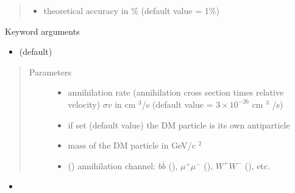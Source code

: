 \documentclass[letterpaper,10pt,english]{sphinxmanual}
\begin{document}
\begin{fulllineitems}
\begin{quote}
\begin{description}
\begin{itemize}
\item {} 
\sphinxAtStartPar
{} \textendash{} theoretical accuracy in \% (default value = 1\%)

\end{itemize}

\end{description}\end{quote}

\sphinxAtStartPar
Keyword arguments
\begin{itemize}
\item {} 
\sphinxAtStartPar
{}    (default)

\end{itemize}
\begin{quote}\begin{description}
\item[{Parameters}] \leavevmode\begin{itemize}
\item {} 
\sphinxAtStartPar
{} \textendash{} annihilation rate (annihilation cross section times relative velocity) \(\sigma v\) in cm \({}^3\)/s (default value = \(3 \times 10^{-26}\) cm \({}^3\) /s)

\item {} 
\sphinxAtStartPar
{} \textendash{} if set  (default value) the DM particle is its own antiparticle

\item {} 
\sphinxAtStartPar
{} \textendash{} mass of the DM particle in GeV/c \({}^2\)

\item {} 
\sphinxAtStartPar
{} () \textendash{} annihilation channel: \(b\bar b\) (), \(\mu^+ \mu^-\) (), \(W^+ W^-\) (), etc.

\end{itemize}

\end{description}\end{quote}
\begin{itemize}
\item {} 
\sphinxAtStartPar
{}


\end{itemize}
\end{fulllineitems}
\end{document}
